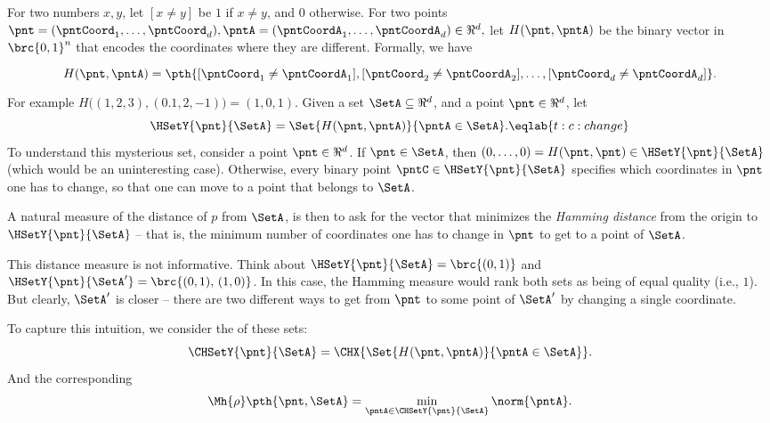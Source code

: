For two numbers $x,y$, let $[x\neq y]$ be $1$ if $x \neq y$, and $0$
otherwise.  For two points
\begin{math}
    \pnt = (\pntCoord_1, \ldots, \pntCoord_d),%
    \pntA = (\pntCoordA_1, \ldots, \pntCoordA_d) \in \Re^d,
\end{math}
let $H(\pnt,\pntA)$ be the binary vector in $\brc{0,1}^n$ that encodes
the coordinates where they are different. Formally, we have
\begin{equation}
  H(\pnt,\pntA)%
  =%
  \pth{\Bigl. [\pntCoord_1 \neq \pntCoordA_1],
  [\pntCoord_2 \neq \pntCoordA_2], \ldots,
  [\pntCoord_d \neq \pntCoordA_d]}.
\end{equation}
For example $H\bigl( (1,2,3), (0.1,2,-1) \bigr) = (1,0,1)$.  Given a
set $\SetA \subseteq \Re^d$, and a point $\pnt \in \Re^d$, let
\begin{equation}
    \HSetY{\pnt}{\SetA} = \Set{H(\pnt,\pntA)}{\pntA \in \SetA}.%
    \eqlab{t:c:change}%
\end{equation}
To understand this mysterious set, consider a point $\pnt \in \Re^d$.
If $\pnt \in \SetA$, then
$(0, \ldots, 0) = H(\pnt,\pnt) \in \HSetY{\pnt}{\SetA}$ (which would
be an uninteresting case). Otherwise, every binary point
$\pntC \in \HSetY{\pnt}{\SetA} $ specifies which coordinates in $\pnt$
one has to change, so that one can move to a point that belongs to
$\SetA$.

A natural measure of the distance of $p$ from $\SetA$, is then to ask
for the vector that minimizes the \emph{Hamming distance} from the
origin to $\HSetY{\pnt}{\SetA}$ -- that is, the minimum number of
coordinates one has to change in $\pnt$ to get to a point of
$\SetA$.

This distance measure is not informative. Think about
$\HSetY{\pnt}{\SetA} = \brc{(0,1) }$ and
$\HSetY{\pnt}{\SetA'}= \brc{(0,1), \, (1,0)}$. In this case, the
Hamming measure would rank both sets as being of equal quality (i.e.,
$1$). But clearly, $\SetA'$ is closer -- there are two different ways
to get from $\pnt$ to some point of $\SetA'$ by changing a single
coordinate.

To capture this intuition, we consider the  of
these sets:
\begin{align*}
  \CHSetY{\pnt}{\SetA} = \CHX{ \bigl.\Set{H(\pnt,\pntA)}{\pntA \in \SetA}}.
\end{align*}
\newcommand{\distTY}[2]{\Mh{\rho}\pth{#1, #2}}%
\newcommand{\distTSqY}[2]{\Mh{\rho^2}\pth{#1, #2}}%
And the corresponding 
\begin{equation}
    \distTY{\pnt}{\SetA} = \min_{\pntA \in \CHSetY{\pnt}{\SetA}}
    \norm{\pntA}.
\end{equation}

